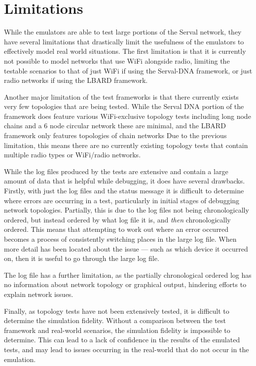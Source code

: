 \section{Limitations}
While the emulators are able to test large portions of the Serval network, they have several limitations that drastically limit the usefulness of the emulators to effectively model real world situations.
The first limitation is that it is currently not possible to model networks that use WiFi alongside radio, limiting the testable scenarios to that of just WiFi if using the Serval-DNA framework, or just radio networks if using the LBARD framework.

Another major limitation of the test frameworks is that there currently exists very few topologies that are being tested.
While the Serval DNA portion of the framework does feature various WiFi-exclusive topology tests including long node chains and a 6 node circular network these are minimal,
and the LBARD framework only features topologies of chain networks
Due to the previous limitation, this means there are no currently existing topology tests that contain multiple radio types or WiFi/radio networks.

While the log files produced by the tests are extensive and contain a large amount of data that is helpful while debugging, it does have several drawbacks.
Firstly, with just the log files and the status message it is difficult to determine where errors are occurring in a test, particularly in initial stages of debugging network topologies.
Partially, this is due to the log files not being chronologically ordered, but instead ordered by what log file it is, and \emph{then} chronologically ordered.
This means that attempting to work out where an error occurred becomes a process of consistently switching places in the large log file.
When more detail has been located about the issue — such as which device it occurred on, then it is useful to go through the large log file.

The log file has a further limitation, as the partially chronological ordered log has no information about network topology or graphical output, hindering efforts to explain network issues.

Finally, as topology tests have not been extensively tested, it is difficult to determine the simulation fidelity.
Without a comparison between the test framework and real-world scenarios, the simulation fidelity is impossible to determine. 
This can lead to a lack of confidence in the results of the emulated tests, and may lead to issues occurring in the real-world that do not occur in the emulation.


